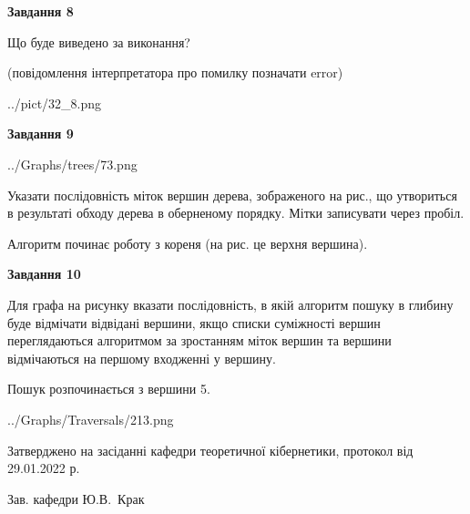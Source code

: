 \documentclass[12pt, ukrainian]{article}
\begin{document}
{\begin {large}
{\begin {center}\textbf{Завдання 8}\end {center}}\par
Що буде виведено за виконання?\par
 (повідомлення інтерпретатора про помилку позначати error)\par
\begin{center}
	{../pict/32_8.png}
\end{center}
\newpage

{\begin {center}\textbf{Завдання 9}\end {center}}\par

\begin{center}
	{../Graphs/trees/73.png}
\end{center}
Указати послідовність міток вершин дерева, зображеного на рис., що утвориться в результаті обходу дерева в оберненому порядку. Мітки записувати через пробіл.\par Алгоритм починає роботу з кореня (на рис. це верхня вершина).\par
\newpage

{\begin {center}\textbf{Завдання 10}\end {center}}\par
Для графа на рисунку вказати послідовність, в якій алгоритм пошуку в глибину буде відмічати відвідані вершини, якщо списки суміжності вершин переглядаються алгоритмом за зростанням міток вершин та вершини відмічаються на першому вход\-женні у вершину.\par
Пошук розпочинається з вершини 5.\par

\begin{center}
	{../Graphs/Traversals/213.png}
\end{center}\par
\newpage


\end {large}
}
{\smallskip \begin {small} Затверджено на засіданні кафедри теоретичної кібернетики, протокол  від   29.01.2022 р.\par\smallskip\smallskip
{\parbox {6.5 cm}{Зав. кафедри \dotfill Ю.В.~Крак}} \end{small}}
\end{document}
